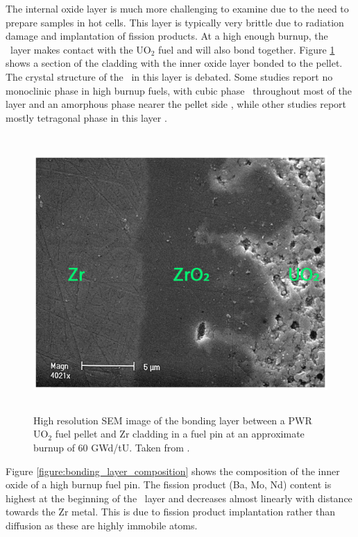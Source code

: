 The internal oxide layer is much more challenging to examine due to the need to prepare samples in hot cells. This layer is typically very brittle due to radiation damage and implantation of fission products. At a high enough burnup, the \zirconia\ layer makes contact with the UO$_{2}$ fuel and will also bond together. Figure \ref{figure:inner_oxide} shows a section of the cladding with the inner oxide layer bonded to the pellet. The crystal structure of the \zirconia\ in this layer is debated. Some studies report no monoclinic phase in high burnup fuels, with cubic phase \zirconia\ throughout most of the layer and an amorphous phase nearer the pellet side \cite{Nogita1997}, while other studies report mostly tetragonal phase in this layer \cite{ciszak2017etude, gibert1998influence}. 

\begin{figure}[ht]
\centering
\includegraphics[height=10.5cm]{images/pci_bondinglayer.png}
\caption[High resolution scanning electron microscrope (SEM) image of the bonding layer between a PWR UO$_{2}$ fuel pellet and Zr cladding in a fuel pin at an approximate burnup of 60 GWd/tU.]{High resolution SEM image of the bonding layer between a PWR UO$_{2}$ fuel pellet and Zr cladding in a fuel pin at an approximate burnup of 60 GWd/tU. Taken from \cite{Lozano1998}.}
\label{figure:inner_oxide}
\end{figure}

Figure \ref{figure:bonding_layer_composition} shows the composition of the inner oxide of a high burnup fuel pin. The fission product (Ba, Mo, Nd) content is highest at the beginning of the \zirconia\ layer and decreases almost linearly with distance towards the Zr metal. This is due to fission product implantation rather than diffusion as these are highly immobile atoms. %

